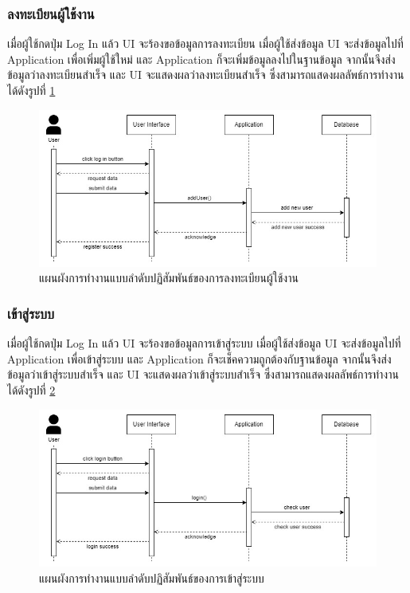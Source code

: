 \documentclass[12pt,oneside,openright,a4paper]{cpe-thai-project}
\begin{document}
\subsubsection{ลงทะเบียนผู้ใช้งาน}
\hspace{1cm}
เมื่อผู้ใช้กดปุ่ม Log In แล้ว UI จะร้องขอข้อมูลการลงทะเบียน เมื่อผู้ใช้ส่งข้อมูล UI จะส่งข้อมูลไปที่ Application
เพื่อเพิ่มผู้ใช้ใหม่ และ Application ก็จะเพิ่มข้อมูลลงไปในฐานข้อมูล จากนั้นจึงส่งข้อมูลว่าลงทะเบียนสำเร็จ
และ UI จะแสดงผลว่าลงทะเบียนสำเร็จ ซึ่งสามารถแสดงผลลัพธ์การทำงานได้ดังรูปที่ \ref{fig:S_Register}
\begin{figure}[!h]\centering
	\includegraphics[width=\textwidth, keepaspectratio=true]{image/chap3/sequence/Register.jpg}
	\caption{แผนผังการทำงานแบบลำดับปฏิสัมพันธ์ของการลงทะเบียนผู้ใช้งาน}\label{fig:S_Register}
\end{figure}

\subsubsection{เข้าสู่ระบบ}
\hspace{1cm}
เมื่อผู้ใช้กดปุ่ม Log In แล้ว UI จะร้องขอข้อมูลการเข้าสู่ระบบ เมื่อผู้ใช้ส่งข้อมูล UI จะส่งข้อมูลไปที่ Application
เพื่อเข้าสู่ระบบ และ Application ก็จะเช็คความถูกต้องกับฐานข้อมูล จากนั้นจึงส่งข้อมูลว่าเข้าสู่ระบบสำเร็จ
และ UI จะแสดงผลว่าเข้าสู่ระบบสำเร็จ ซึ่งสามารถแสดงผลลัพธ์การทำงานได้ดังรูปที่ \ref{fig:S_LogIn}
\begin{figure}[!h]\centering
	\includegraphics[width=\textwidth, keepaspectratio=true]{image/chap3/sequence/Login.jpg}
	\caption{แผนผังการทำงานแบบลำดับปฏิสัมพันธ์ของการเข้าสู่ระบบ}\label{fig:S_LogIn}
\end{figure}
\end{document}

